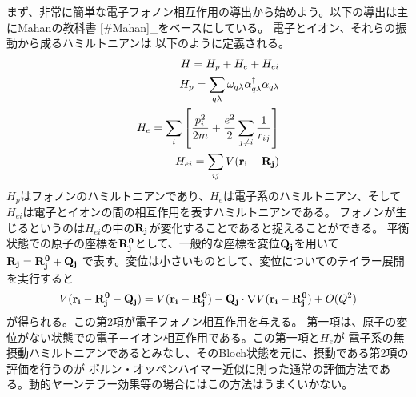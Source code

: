 \documentclass[letterpaper,10pt,dvipdfmx]{sphinxhowto}
\begin{document}
まず、非常に簡単な電子フォノン相互作用の導出から始めよう。以下の導出は主にMahanの教科書 {[}\#Mahan{]}\_をベースにしている。
電子とイオン、それらの振動から成るハミルトニアンは
以下のように定義される。
\begin{equation*}
\begin{split}\begin{aligned}
H=H_p+H_e+H_{ei} \\
H_p=\sum_{q\lambda} \omega_{q\lambda} \alpha_{q\lambda}^\dagger
\alpha_{q\lambda} \\
H_e =\sum_{i} \left [ \frac{p_i^2}{2m} + \frac{e^2}{2} \sum_{j\neq i}
\frac{1}{r_{ij}} \right] \\
H_{ei} = \sum_{ij} V(\bf{r_i} -  \bf{R_j})\end{aligned}\end{split}
\end{equation*}
\(H_p\)はフォノンのハミルトニアンであり、\(H_e\)は電子系のハミルトニアン、そして\(H_{ei}\)は電子とイオンの間の相互作用を表すハミルトニアンである。
フォノンが生じるというのは\(H_{ei}\)の中の\(\bf{R_j}\)が変化することであると捉えることができる。
平衡状態での原子の座標を\(\bf{R_j^{0}}\)として、一般的な座標を変位\(\bf{Q_j}\)を用いて\(\bf{R_j}=\bf{R_j^{0}}+\bf{Q_j}\)
で表す。変位は小さいものとして、変位についてのテイラー展開を実行すると
\begin{equation*}
\begin{split}\begin{aligned}
V({\bf r_i} - {\bf R_j^{0}}-{\bf Q_j})=V({\bf r_i} - {\bf
R_j^{0}})-{\bf Q_j}\cdot \nabla V({\bf r_i} - {\bf R_j^{0}}) +O(Q^2)\end{aligned}\end{split}
\end{equation*}
が得られる。この第2項が電子フォノン相互作用を与える。
第一項は、原子の変位がない状態での電子－イオン相互作用である。この第一項と\(H_e\)が
電子系の無摂動ハミルトニアンであるとみなし、そのBloch状態を元に、摂動である第2項の評価を行うのが
ボルン・オッペンハイマー近似に則った通常の評価方法である。動的ヤーンテラー効果等の場合にはこの方法はうまくいかない。
\end{document}
